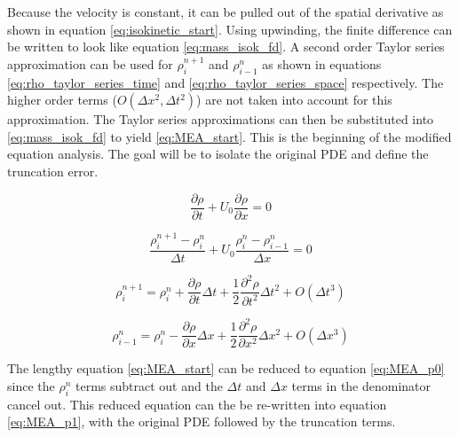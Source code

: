 \documentclass{mc2015}
\begin{document}
    Because the velocity is constant, it can be pulled out of the spatial
    derivative as shown in equation \ref{eq:isokinetic_start}. Using upwinding,
    the finite difference can be written to look like equation
    \ref{eq:mass_isok_fd}. A second order Taylor series approximation can be
    used for $\rho_{i}^{n+1}$ and $\rho_{i-1}^{n}$ as shown in equations
    \ref{eq:rho_taylor_series_time} and \ref{eq:rho_taylor_series_space}
    respectively. The higher order terms ($O(\Delta x^{2},\Delta t^{2} )$) are
    not taken into account for this approximation. The Taylor series
    approximations can then be substituted into \ref{eq:mass_isok_fd} to yield
    \ref{eq:MEA_start}. This is the beginning of the modified equation analysis.
    The goal will be to isolate the original PDE and define the truncation error.
    
    \begin{equation}
    	\label{eq:isokinetic_start}
    	\frac{\partial \rho}{\partial t} + U_{0} \frac{\partial \rho}{\partial x} = 0
    \end{equation}
    
    \begin{equation}
    	\label{eq:mass_isok_fd}
    	\frac{ \rho_{i}^{n+1} - \rho_{i}^{n} }{\Delta t} 
    	+ U_{0} \frac{\rho_{i}^{n} - \rho_{i-1}^{n}}{\Delta x} = 0
    \end{equation}
    
    \begin{equation}
    	\label{eq:rho_taylor_series_time}
    	\rho_{i}^{n+1} =  \rho_{i}^{n} + 
    	\frac{\partial \rho}{\partial t} \Delta t +
    	\frac{1}{2} \frac{\partial^2 \rho}{\partial t^2} \Delta t^2 + O(\Delta t^{3})
    \end{equation}
    
    \begin{equation}
    	\label{eq:rho_taylor_series_space}
    	\rho_{i-1}^{n} =  \rho_{i}^{n} - 
    	\frac{\partial \rho}{\partial x} \Delta x +
    	\frac{1}{2} \frac{\partial^2 \rho}{\partial x^2} \Delta x^2 + O(\Delta x^{3})
    \end{equation}
    
    The lengthy equation \ref{eq:MEA_start} can be reduced to equation
    \ref{eq:MEA_p0} since the $\rho_{i}^{n}$ terms subtract out and the $\Delta
    t$ and $\Delta x$ terms in the denominator cancel out. This reduced equation
    can the be re-written into equation \ref{eq:MEA_p1}, with the original PDE
    followed by the truncation terms. 
    
\end{document}
